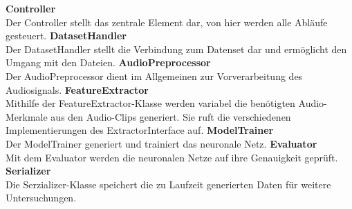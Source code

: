 \noindent \textbf{Controller}\\
Der Controller stellt das zentrale Element dar, von hier werden alle Abläufe gesteuert.
\newline
\noindent \textbf{DatasetHandler}\\
Der DatasetHandler stellt die Verbindung zum Datenset dar und ermöglicht den Umgang mit den Dateien.
\newline
\noindent \textbf{AudioPreprocessor}\\
Der AudioPreprocessor dient im Allgemeinen zur Vorverarbeitung des Audiosignals.
\newline
\noindent \textbf{FeatureExtractor}\\
Mithilfe der FeatureExtractor-Klasse werden variabel die benötigten Audio-Merkmale aus den Audio-Clips generiert. Sie ruft die verschiedenen Implementierungen des ExtractorInterface auf.
\newline
\noindent \textbf{ModelTrainer}\\
Der ModelTrainer generiert und trainiert das neuronale Netz.
\newline
\noindent \textbf{Evaluator}\\
Mit dem Evaluator werden die neuronalen Netze auf ihre Genauigkeit geprüft.
\newline
\noindent \textbf{Serializer}\\
Die Serzializer-Klasse speichert die zu Laufzeit generierten Daten für weitere Untersuchungen.
\newparagraph

